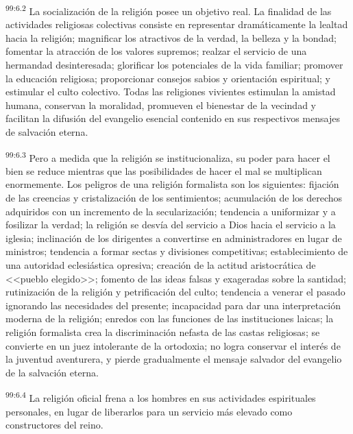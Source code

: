 \par
\textsuperscript{99:6.2} La socialización de la religión posee un objetivo real. La finalidad de las actividades religiosas colectivas consiste en representar dramáticamente la lealtad hacia la religión; magnificar los atractivos de la verdad, la belleza y la bondad; fomentar la atracción de los valores supremos; realzar el servicio de una hermandad desinteresada; glorificar los potenciales de la vida familiar; promover la educación religiosa; proporcionar consejos sabios y orientación espiritual; y estimular el culto colectivo. Todas las religiones vivientes estimulan la amistad humana, conservan la moralidad, promueven el bienestar de la vecindad y facilitan la difusión del evangelio esencial contenido en sus respectivos mensajes de salvación eterna.

\par
\textsuperscript{99:6.3} Pero a medida que la religión se institucionaliza, su poder para hacer el bien se reduce mientras que las posibilidades de hacer el mal se multiplican enormemente. Los peligros de una religión formalista son los siguientes: fijación de las creencias y cristalización de los sentimientos; acumulación de los derechos adquiridos con un incremento de la secularización; tendencia a uniformizar y a fosilizar la verdad; la religión se desvía del servicio a Dios hacia el servicio a la iglesia; inclinación de los dirigentes a convertirse en administradores en lugar de ministros; tendencia a formar sectas y divisiones competitivas; establecimiento de una autoridad eclesiástica opresiva; creación de la actitud aristocrática de <<pueblo elegido>>; fomento de las ideas falsas y exageradas sobre la santidad; rutinización de la religión y petrificación del culto; tendencia a venerar el pasado ignorando las necesidades del presente; incapacidad para dar una interpretación moderna de la religión; enredos con las funciones de las instituciones laicas; la religión formalista crea la discriminación nefasta de las castas religiosas; se convierte en un juez intolerante de la ortodoxia; no logra conservar el interés de la juventud aventurera, y pierde gradualmente el mensaje salvador del evangelio de la salvación eterna.

\par
\textsuperscript{99:6.4} La religión oficial frena a los hombres en sus actividades espirituales personales, en lugar de liberarlos para un servicio más elevado como constructores del reino.

